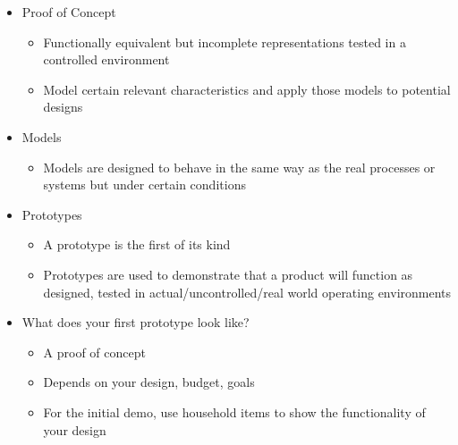 \begin{itemize}

  \item Proof of Concept

    \begin{itemize}

      \item Functionally equivalent but incomplete representations tested in a controlled environment

      \item Model certain relevant characteristics and apply those models to potential designs

    \end{itemize}

  \item Models

    \begin{itemize}

      \item Models are designed to behave in the same way as the real processes or systems but under certain conditions

    \end{itemize}

  \item Prototypes

    \begin{itemize}

      \item A prototype is the first of its kind

      \item Prototypes are used to demonstrate that a product will function as designed, tested in actual/uncontrolled/real world operating environments

    \end{itemize}

  \item What does your first prototype look like?

    \begin{itemize}

      \item A proof of concept 

      \item Depends on your design, budget, goals

      \item For the initial demo, use household items to show the functionality of your design

    \end{itemize}


\end{itemize}
